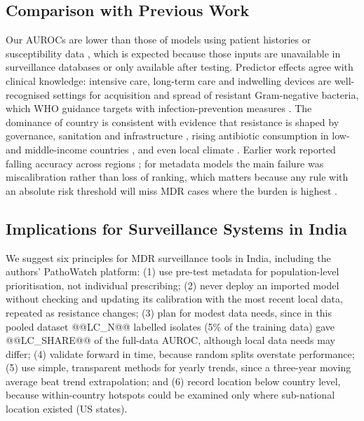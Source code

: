 \documentclass[conference]{IEEEtran}
\begin{document}
\subsection{Comparison with Previous Work}
Our AUROCs are lower than those of models using patient histories \cite{yelin2019,lewinepstein2021} or susceptibility data \cite{valavarasu2025,wishal2026}, which is expected because those inputs are unavailable in surveillance databases or only available after testing. Predictor effects agree with clinical knowledge: intensive care, long-term care and indwelling devices are well-recognised settings for acquisition and spread of resistant Gram-negative bacteria, which WHO guidance targets with infection-prevention measures \cite{who2017cre}. The dominance of country is consistent with evidence that resistance is shaped by governance, sanitation and infrastructure \cite{collignon2018}, rising antibiotic consumption in low- and middle-income countries \cite{klein2018}, and even local climate \cite{macfadden2018}. Earlier work reported falling accuracy across regions \cite{nsubuga2024}; for metadata models the main failure was miscalibration rather than loss of ranking, which matters because any rule with an absolute risk threshold will miss MDR cases where the burden is highest \cite{vancalster2019}.

\subsection{Implications for Surveillance Systems in India}
We suggest six principles for MDR surveillance tools in India, including the authors' PathoWatch platform: (1) use pre-test metadata for population-level prioritisation, not individual prescribing; (2) never deploy an imported model without checking and updating its calibration with the most recent local data, repeated as resistance changes; (3) plan for modest data needs, since in this pooled dataset @@LC_N@@ labelled isolates (5\% of the training data) gave @@LC_SHARE@@ of the full-data AUROC, although local data needs may differ; (4) validate forward in time, because random splits overstate performance; (5) use simple, transparent methods for yearly trends, since a three-year moving average beat trend extrapolation; and (6) record location below country level, because within-country hotspots could be examined only where sub-national location existed (US states).
\end{document}
